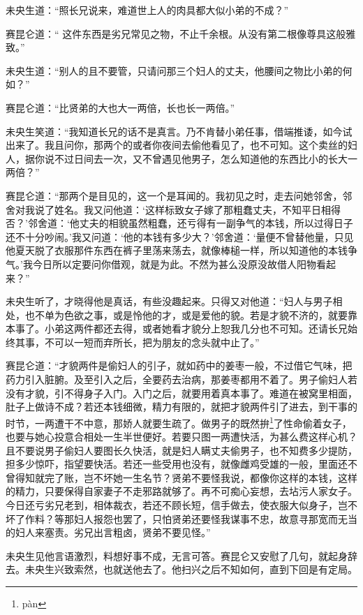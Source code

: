 \documentclass[a4paper,12pt,UTF8,twoside]{ctexbook}
\begin{document}
未央生道：“照长兄说来，难道世上人的肉具都大似小弟的不成？”

赛昆仑道：“
这件东西是劣兄常见之物，不止千余根。从没有第二根像尊具这般雅致。”

未央生道：“别人的且不要管，只请问那三个妇人的丈夫，他腰间之物比小弟的何如？”

赛昆仑道：“比贤弟的大也大一两倍，长也长一两倍。”

未央生笑道：“我知道长兄的话不是真言。乃不肯替小弟任事，借端推诿，如今试出来了。我且问你，那两个的或者你夜间去偷他看见了，也不可知。这个卖丝的妇人，据你说不过日间去一次，又不曾遇见他男子，怎么知道他的东西比小的长大一两倍？”

赛昆仑道：“那两个是目见的，这一个是耳闻的。我初见之时，走去问她邻舍，邻舍对我说了姓名。我又问他道：‘这样标致女子嫁了那粗蠢丈夫，不知平日相得否？’邻舍道：‘他丈夫的相貌虽然粗蠢，还亏得有一副争气的本钱，所以过得日子还不十分吵闹。’我又问道：‘他的本钱有多少大？’邻舍道：‘量便不曾替他量，只见他夏天脱了衣服那件东西在裤子里荡来荡去，就像棒槌一样，所以知道他的本钱争气。’我今日所以定要问你借观，就是为此。不然为甚么没原没故借人阳物看起来？”

未央生听了，才晓得他是真话，有些没趣起来。只得又对他道：“妇人与男子相处，也不单为色欲之事，或是怜他的才，或是爱他的貌。若是才貌不济的，就要靠本事了。小弟这两件都还去得，或者她看才貌分上恕我几分也不可知。还请长兄始终其事，不可以一短而弃所长，把为朋友的念头就中止了。”

赛昆仑道：“才貌两件是偷妇人的引子，就如药中的姜枣一般，不过借它气味，把药力引入脏腑。及至引入之后，全要药去治病，那姜枣都用不着了。男子偷妇人若没有才貌，引不得身子入门。入门之后，就要用着真本事了。难道在被窝里相面，肚子上做诗不成？若还本钱细微，精力有限的，就把才貌两件引了进去，到干事的时节，一两遭干不中意，那娇人就要生疏了。做男子的既然拚\footnote{p\`an}了性命偷着女子，也要与她心投意合相处一生半世便好。若要只图一两遭快活，为甚么费这样心机？且不要说男子偷妇人要图长久快活，就是妇人瞒丈夫偷男子，也不知费多少提防，担多少惊吓，指望要快活。若还一些受用也没有，就像雌鸡受雄的一般，里面还不曾得知就完了账，岂不坏她一生名节？贤弟不要怪我说，都像你这样的本钱，这样的精力，只要保得自家妻子不走邪路就够了。再不可痴心妄想，去坫污人家女子。今日还亏劣兄老到，相体裁衣，若还不顾长短，信手做去，使衣服大似身子，岂不坏了作料？等那妇人报怨也罢了，只怕贤弟还要怪我谋事不忠，故意寻那宽而无当的妇人来塞责。劣兄出言粗卤，贤弟不要见怪。”

未央生见他言语激烈，料想好事不成，无言可答。赛昆仑又安慰了几句，就起身辞去。未央生兴致索然，也就送他去了。他扫兴之后不知如何，直到下回是有定局。
\end{document}
